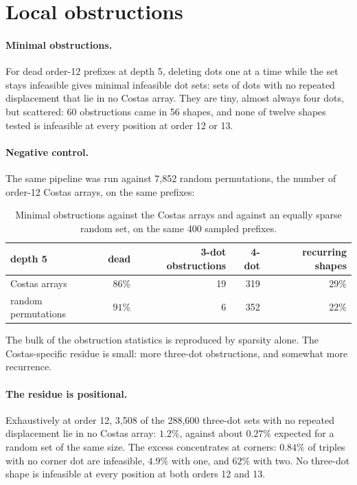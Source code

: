 \section{Local obstructions}
\label{sec:local}
\paragraph{Minimal obstructions.} For dead order-12 prefixes at depth 5, deleting dots one at a time while the
set stays infeasible gives minimal infeasible dot sets: sets of dots with no repeated displacement that lie
in no Costas array. They are tiny, almost always four dots, but scattered: 60 obstructions came in 56
shapes, and none of twelve shapes tested is infeasible at every position at order 12 or 13.

\paragraph{Negative control.} The same pipeline was run against 7{,}852 random permutations, the number of
order-12 Costas arrays, on the same prefixes:

\begin{table}[H]
\centering
\small
\begin{tabular}{@{}lrrrr@{}}
\toprule
depth 5 & dead & 3-dot obstructions & 4-dot & recurring shapes \\
\midrule
Costas arrays & $86\%$ & 19 & 319 & $29\%$ \\
random permutations & $91\%$ & 6 & 352 & $22\%$ \\
\bottomrule
\end{tabular}
\caption{Minimal obstructions against the Costas arrays and against an equally sparse random set, on the same
400 sampled prefixes.}
\label{tab:control}
\end{table}

\noindent The bulk of the obstruction statistics is reproduced by sparsity alone. The Costas-specific residue
is small: more three-dot obstructions, and somewhat more recurrence.

\paragraph{The residue is positional.} Exhaustively at order 12, 3{,}508 of the 288{,}600 three-dot sets with no
repeated displacement lie in no Costas array: $1.2\%$, against about $0.27\%$ expected for a random set of the
same size. The excess concentrates at corners: $0.84\%$ of triples with no corner dot are infeasible, $4.9\%$
with one, and $62\%$ with two. No three-dot shape is infeasible at every position at both orders 12 and 13.

